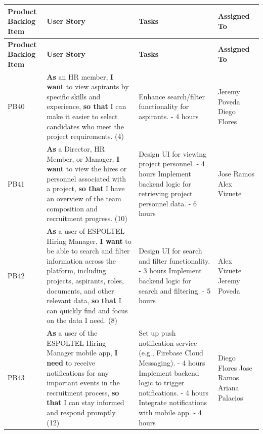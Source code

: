 \documentclass{scrreprt}
\begin{document}
\begin{longtable}{|p{1.5cm}|p{5.5cm}|p{4.5cm}|p{3cm}|} \hline
	\textbf{Product Backlog Item} & \textbf{User Story} & \textbf{Tasks} & \textbf{Assigned To} \\ \hline
	\endfirsthead
	\hline
	\textbf{Product Backlog Item} & \textbf{User Story} & \textbf{Tasks} & \textbf{Assigned To} \\ \hline
	\endhead
	
	PB40 & \textbf{As} an HR member, \textbf{I want} to view aspirants by specific skills and experience, \textbf{so that} I can make it easier to select candidates who meet the project requirements. (4) &
	Enhance search/filter functionality for aspirants. - 4 hours &
	Jeremy Poveda \newline
	Diego Flores \\ \hline
	
	PB41 & \textbf{As} a Director, HR Member, or Manager, \textbf{I want} to view the hires or personnel associated with a project, \textbf{so that} I have an overview of the team composition and recruitment progress. (10) &
	Design UI for viewing project personnel. - 4 hours \newline
	Implement backend logic for retrieving project personnel data. - 6 hours &
	Jose Ramos \newline
	Alex Vizuete \\ \hline
	
	PB42 & \textbf{As} a user of ESPOLTEL Hiring Manager, \textbf{I want} to be able to search and filter information across the platform, including projects, aspirants, roles, documents, and other relevant data, \textbf{so that} I can quickly find and focus on the data I need. (8) &
	Design UI for search and filter functionality. - 3 hours \newline
	Implement backend logic for search and filtering. - 5 hours &
	Alex Vizuete \newline
	Jeremy Poveda \\ \hline
	
	PB43 & \textbf{As} a user of the ESPOLTEL Hiring Manager mobile app, \textbf{I need} to receive notifications for any important events in the recruitment process, \textbf{so that} I can stay informed and respond promptly. (12) &
	Set up push notification service (e.g., Firebase Cloud Messaging). - 4 hours \newline
	Implement backend logic to trigger notifications. - 4 hours \newline
	Integrate notifications with mobile app. - 4 hours &
	Diego Flores \newline
	Jose Ramos \newline
	Ariana Palacios \\ \hline
	

\end{longtable}
\end{document}
